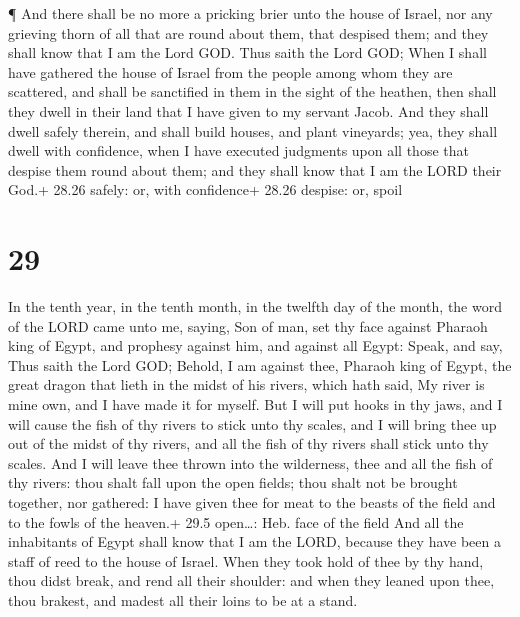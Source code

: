  ¶ And there shall be no more a pricking brier unto the
house of Israel, nor any grieving thorn of all that are round about
them, that despised them; and they shall know that I am the Lord GOD.
 Thus saith the Lord GOD; When I shall have gathered the
house of Israel from the people among whom they are scattered, and shall
be sanctified in them in the sight of the heathen, then shall they dwell
in their land that I have given to my servant Jacob.  And
they shall dwell safely therein, and shall build houses, and plant
vineyards; yea, they shall dwell with confidence, when I have executed
judgments upon all those that despise them round about them; and they
shall know that I am the LORD their God.+ 28.26 safely: or, with
confidence+ 28.26 despise: or, spoil

\hypertarget{section-28}{%
\section{29}\label{section-28}}

 In the tenth year, in the tenth month, in the twelfth day
of the month, the word of the LORD came unto me, saying, 
Son of man, set thy face against Pharaoh king of Egypt, and prophesy
against him, and against all Egypt:  Speak, and say, Thus
saith the Lord GOD; Behold, I am against thee, Pharaoh king of Egypt,
the great dragon that lieth in the midst of his rivers, which hath said,
My river is mine own, and I have made it for myself.  But I
will put hooks in thy jaws, and I will cause the fish of thy rivers to
stick unto thy scales, and I will bring thee up out of the midst of thy
rivers, and all the fish of thy rivers shall stick unto thy scales.
 And I will leave thee thrown into the wilderness, thee and
all the fish of thy rivers: thou shalt fall upon the open fields; thou
shalt not be brought together, nor gathered: I have given thee for meat
to the beasts of the field and to the fowls of the heaven.+ 29.5
open\ldots: Heb. face of the field  And all the inhabitants
of Egypt shall know that I am the LORD, because they have been a staff
of reed to the house of Israel.  When they took hold of thee
by thy hand, thou didst break, and rend all their shoulder: and when
they leaned upon thee, thou brakest, and madest all their loins to be at
a stand.

